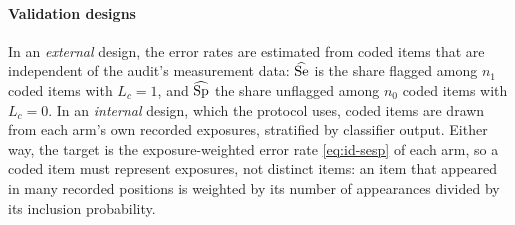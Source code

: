 \paragraph{Validation designs}
In an \emph{external} design, the error rates are estimated from coded items that are independent of the audit's measurement data: $\widehat{\mathrm{Se}}$ is the share flagged among $n_1$ coded items with $L_c=1$, and $\widehat{\mathrm{Sp}}$ the share unflagged among $n_0$ coded items with $L_c=0$. In an \emph{internal} design, which the protocol uses, coded items are drawn from each arm's own recorded exposures, stratified by classifier output. Either way, the target is the exposure-weighted error rate \eqref{eq:id-sesp} of each arm, so a coded item must represent exposures, not distinct items: an item that appeared in many recorded positions is weighted by its number of appearances divided by its inclusion probability.

